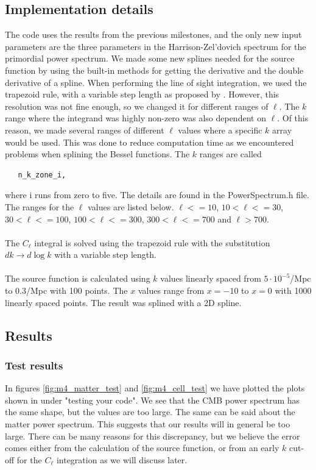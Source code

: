 \documentclass{aa}
\begin{document}
\subsection{Implementation details}
The code uses the results from the previous milestones, and the only new input parameters are the three parameters in the Harrison-Zel'dovich spectrum for the primordial power
spectrum. We made some new splines needed for the source function by using the built-in methods for getting the derivative and the double derivative of a spline.  When performing the line of sight integration, we used the trapezoid rule, with a variable step length as proposed by \cite{Callin}. However, this 
resolution was not fine enough, so we changed it for different ranges of $\ell$. The $k$ range where the integrand was highly non-zero was also dependent on $\ell$. 
Of this reason, we made several ranges of different $\ell$ values where a specific $k$ array would be used. This was done to reduce computation time as we encountered problems when splining 
the Bessel functions. The $k$ ranges are
called 
\begin{verbatim}
   n_k_zone_i,
\end{verbatim} where i runs from zero to five. The details are found in the PowerSpectrum.h file. The ranges for the $\ell$ values are listed below.
$\ell <= 10$, $10 < \ell  <=30$, $30 < \ell<=100$, $100 <\ell <=300$, $300 <\ell <=700$ and $\ell > 700$.\\
\\
The $C_\ell$ integral is solved using the trapezoid rule with the substitution $dk\rightarrow d\log k$ with a variable step length.\\
\\
The source function is calculated using $k$ values linearly spaced from $5\cdot 10^{-5}$/Mpc to 0.3/Mpc with 100 points. The $x$ values range from $x=-10$ to $x=0$ with 
1000 linearly spaced points. The result was splined with a 2D spline.
\subsection{Results}

\subsubsection{Test results}
In figures \ref{fig:m4_matter_test} and \ref{fig:m4_cell_test} we have plotted the plots shown in \cite{winther:2023} under "testing your code". We see that the CMB power
spectrum has the same shape, but the values are too large. The same can be said about the matter power spectrum. This suggests that our results will in general be too large.
There can be many reasons for this discrepancy, but we believe the error comes either from the calculation of the source function, or from an early $k$ cut-off for the $C_\ell$ integration as we will discuss later.
\end{document}
